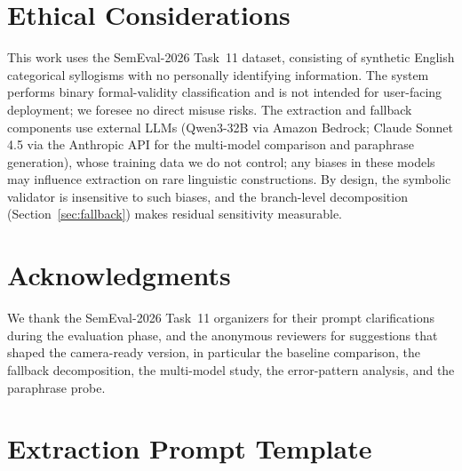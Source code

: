 \documentclass[11pt]{article}
\begin{document}
\section*{Ethical Considerations}

This work uses the SemEval-2026 Task~11 dataset, consisting of synthetic English categorical syllogisms with no personally identifying information. The system performs binary formal-validity classification and is not intended for user-facing deployment; we foresee no direct misuse risks. The extraction and fallback components use external LLMs (Qwen3-32B via Amazon Bedrock; Claude Sonnet 4.5 via the Anthropic API for the multi-model comparison and paraphrase generation), whose training data we do not control; any biases in these models may influence extraction on rare linguistic constructions. By design, the symbolic validator is insensitive to such biases, and the branch-level decomposition (Section~\ref{sec:fallback}) makes residual sensitivity measurable.


\section*{Acknowledgments}

We thank the SemEval-2026 Task~11 organizers for their prompt clarifications during the evaluation phase, and the anonymous reviewers for suggestions that shaped the camera-ready version, in particular the baseline comparison, the fallback decomposition, the multi-model study, the error-pattern analysis, and the paraphrase probe.





\appendix
\section{Extraction Prompt Template}
\label{app:prompt}
\end{document}
